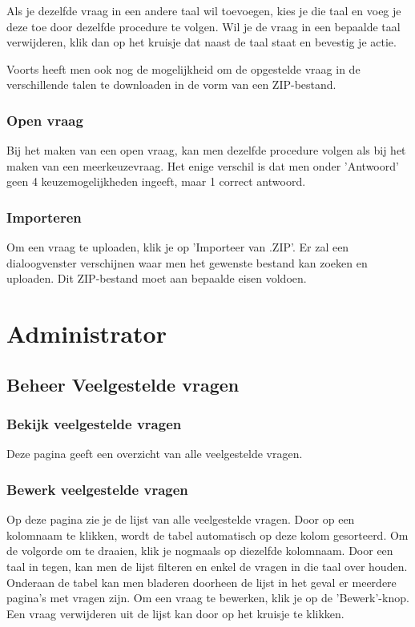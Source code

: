 \documentclass[]{article}
\begin{document}
Als je dezelfde vraag in een andere taal wil toevoegen, kies je die taal en voeg je deze toe door dezelfde procedure te volgen. Wil je de vraag in een bepaalde taal verwijderen, klik dan op het kruisje dat naast de taal staat en bevestig je actie. 

Voorts heeft men ook nog de mogelijkheid om de opgestelde vraag in de verschillende talen te downloaden in de vorm van een ZIP-bestand. 

\subsubsection{Open vraag}

Bij het maken van een open vraag, kan men dezelfde procedure volgen als bij het maken van een meerkeuzevraag. Het enige verschil is dat men onder 'Antwoord' geen 4 keuzemogelijkheden ingeeft, maar 1 correct antwoord.

\subsubsection{Importeren}
Om een vraag te uploaden, klik je op 'Importeer van .ZIP'. Er zal een dialoogvenster verschijnen waar men het gewenste bestand kan zoeken en uploaden. Dit ZIP-bestand moet aan bepaalde eisen voldoen.


\section{Administrator}

\subsection{Beheer Veelgestelde vragen}

\subsubsection{Bekijk veelgestelde vragen}
Deze pagina geeft een overzicht van alle veelgestelde vragen.

\subsubsection{Bewerk veelgestelde vragen}
Op deze pagina zie je de lijst van alle veelgestelde vragen. Door op een kolomnaam te klikken, wordt de tabel automatisch op deze kolom gesorteerd. Om de volgorde om te draaien, klik je nogmaals op diezelfde kolomnaam. Door een taal in tegen, kan men de lijst filteren en enkel de vragen in die taal over houden. Onderaan de tabel kan men bladeren doorheen de lijst in het geval er meerdere pagina's met vragen zijn. Om een vraag te bewerken, klik je op de 'Bewerk'-knop. Een vraag verwijderen uit de lijst kan door op het kruisje te klikken.
\end{document}
